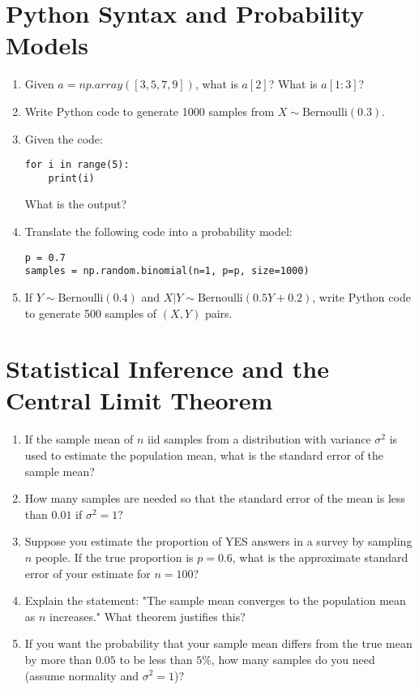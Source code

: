 \section{Python Syntax and Probability Models}
\begin{enumerate}[label=\arabic*.]
\item Given $a = np.array([3, 5, 7, 9])$, what is $a[2]$? What is $a[1:3]$?

\item Write Python code to generate 1000 samples from $X \sim \text{Bernoulli}(0.3)$.

\item Given the code:
\begin{verbatim}
for i in range(5):
	print(i)
\end{verbatim}
What is the output?

\item Translate the following code into a probability model:
\begin{verbatim}
p = 0.7
samples = np.random.binomial(n=1, p=p, size=1000)
\end{verbatim}

\item If $Y \sim \text{Bernoulli}(0.4)$ and $X|Y \sim \text{Bernoulli}(0.5Y + 0.2)$, write Python code to generate 500 samples of $(X, Y)$ pairs.
\end{enumerate}

\section{Statistical Inference and the Central Limit Theorem}
\begin{enumerate}[label=\arabic*.]
\item If the sample mean of $n$ iid samples from a distribution with variance $\sigma^2$ is used to estimate the population mean, what is the standard error of the sample mean?

\item How many samples are needed so that the standard error of the mean is less than $0.01$ if $\sigma^2 = 1$?

\item Suppose you estimate the proportion of YES answers in a survey by sampling $n$ people. If the true proportion is $p=0.6$, what is the approximate standard error of your estimate for $n=100$?

\item Explain the statement: "The sample mean converges to the population mean as $n$ increases." What theorem justifies this?

\item If you want the probability that your sample mean differs from the true mean by more than $0.05$ to be less than $5\%$, how many samples do you need (assume normality and $\sigma^2=1$)?
\end{enumerate}


